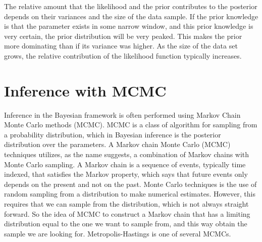 The relative amount that the likelihood and the prior contributes to the posterior depends on their variances and the size of the data sample. If the prior knowledge is that the parameter exists in some narrow window, and this prior knowledge is very certain, the prior distribution will be very peaked. This makes the prior more dominating than if its variance was higher. As the size of the data set grows, the relative contribution of the likelihood function typically  increases. 










\section{Inference with MCMC}
\label{Metropolis}

Inference in the Bayesian framework is often performed using Markov Chain Monte Carlo methods (MCMC). MCMC is a class of algorithm for sampling from a probability distribution, which in Bayesian inference is the posterior distribution over the parameters. A Markov chain Monte Carlo (MCMC) techniques utilizes, as the name suggests, a combination of Markov chains with Monte Carlo sampling. A Markov chain is a sequence of events, typically time indexed, that satisfies the Markov property, which says that future events only depends on the present and not on the past. Monte Carlo techniques is the use of random sampling from a distribution to make numerical estimates. However, this requires that we can sample from the distribution, which is not always straight forward. So the idea of MCMC to construct a Markov chain that has a limiting distribution equal to the one we want to sample from, and this way obtain the sample we are looking for. Metropolis-Hastings is one of several MCMCs.

